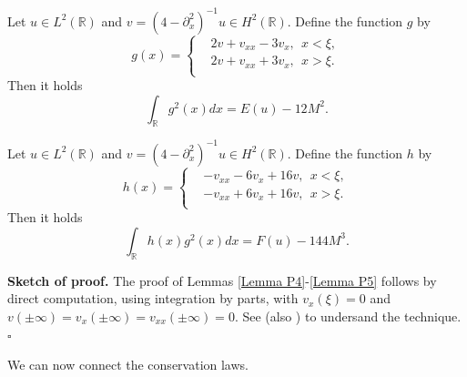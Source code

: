 \documentclass[10pt,a4paper,twoside]{article}
\begin{document}
\begin{Lem}\label{Lemma P4}
Let $u\in L^{2}(\mathbb{R})$ and $v=(4-\partial^{2}_{x})^{-1}u\in H^{2}(\mathbb{R})$. Define the function $g$ by
\begin{equation}
  g(x)=\left\{
    \begin{aligned}
     &2v+v_{xx}-3v_{x},~~x<\xi,\\
     &2v+v_{xx}+3v_{x},~~x>\xi.\\
    \end{aligned}
  \right.
  \label{GG1}
\end{equation}
Then it holds
\begin{equation}
\int_{\mathbb{R}}g^{2}(x)dx=E(u)-12M^{2}.
\label{GG2}
\end{equation}
\end{Lem}








\begin{Lem}\label{Lemma P5}
Let $u\in L^{2}(\mathbb{R})$ and $v=(4-\partial^{2}_{x})^{-1}u\in H^{2}(\mathbb{R})$. Define the function $h$ by
\begin{equation}
  h(x)=\left\{
    \begin{aligned}
     &-v_{xx}-6v_{x}+16v,~~x<\xi,\\
     &-v_{xx}+6v_{x}+16v,~~x>\xi.\\
    \end{aligned}
  \right.
  \label{HH1}
\end{equation}
Then it holds
\begin{equation}
\int_{\mathbb{R}}h(x)g^{2}(x)dx=F(u)-144M^{3}.
\label{HH2}
\end{equation}
\end{Lem}





\textbf{Sketch of proof.} The proof of Lemmas \ref{Lemma P4}-\ref{Lemma P5} follows by direct computation, using integration by parts, with
$v_{x}(\xi)=0$ and $v(\pm\infty)=v_{x}(\pm\infty)=v_{xx}(\pm\infty)=0$. See \cite{MR2460268} (also \cite{AK})
to undersand the technique. 
\hfill $ \square $ \vspace*{2mm}

We can now connect the conservation laws.
\end{document}
